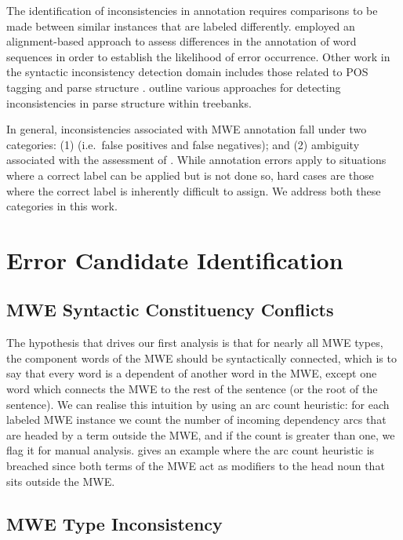 \documentclass[output=paper
,modfonts
,nonflat]{langsci/langscibook}
\begin{document}
The identification of inconsistencies in annotation requires comparisons to be made between similar instances that are labeled differently. \citet{boyd-et-al:07a} employed an alignment-based approach to assess differences in the annotation of \ngram word sequences in order to establish the likelihood of error occurrence.  Other work in the syntactic inconsistency detection domain includes those related to POS tagging \citep{loftsson2009correcting,Eskin:2000:DEW:974305.974325,ma2001line} and parse structure \citep{ule2004unexpected,kato2010correcting}. \citet{Dickinson03} outline various approaches for detecting inconsistencies in parse structure within treebanks. 

In general, inconsistencies associated with MWE annotation fall under two categories: (1)  (i.e.\ false positives and false negatives); and (2) ambiguity associated with the assessment of . While annotation errors apply to situations where a correct label can be applied but is not done so, hard cases are those where the correct label is inherently difficult to assign. We address both these categories in this work.  

\section{Error Candidate Identification}

\subsection{MWE Syntactic Constituency Conflicts}

The hypothesis that drives our first analysis is that for nearly all MWE types, the component words of the MWE should be syntactically connected, which is to say that every word is a dependent of another word in the MWE, except one word which connects the MWE to the rest of the sentence (or the root of the sentence). We can realise this intuition by using an arc count heuristic: for each labeled MWE instance we count the number of incoming dependency arcs that are headed by a term outside the MWE, and if the count is greater than one, we flag it for manual analysis.  gives an example where the arc count heuristic is breached since both terms of the MWE  act as modifiers to the head noun that sits outside the MWE.

\subsection{MWE Type Inconsistency}
\end{document}
